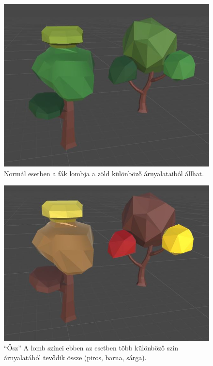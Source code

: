 \begin{figure}[h!]
\centering
\includegraphics[scale=0.26]{kepek/Tree_Normal.JPG}
\caption[normal]{Normál esetben a fák lombja a zöld különböző árnyalataiból állhat. \footnotemark}
\label{fig:Tree_Normal}
\end{figure}


\begin{figure}[h!]
\centering
\includegraphics[scale=0.26]{kepek/Tree_Fall.JPG}
\caption[Ősz]{“Ősz” A lomb színei ebben az esetben több különböző szín árnyalatából tevődik össze (piros, barna, sárga). \footnotemark}
\label{fig:Tree_Fall}
\end{figure}

